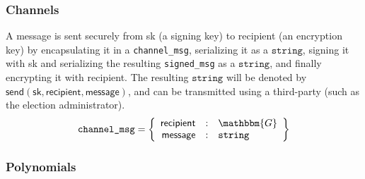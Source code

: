 \documentclass[a4paper]{article}
\newcommand{\G}{\mathbbm{G}}
\newcommand{\jstring}{\texttt{string}}
\begin{document}
\subsubsection{Channels}
\label{channels}

A \textsf{message} is sent securely from \textsf{sk} (a signing key)
to \textsf{recipient} (an encryption key) by encapsulating it in a
\texttt{channel\_msg}, serializing it as a $\jstring$, signing it with
\textsf{sk} and serializing the resulting \texttt{signed\_msg} as a
$\jstring$, and finally encrypting it with \textsf{recipient}. The
resulting $\jstring$ will be denoted by
$\textsf{send}(\textsf{sk},\textsf{recipient},\textsf{message})$, and
can be transmitted using a third-party (such as the election
administrator).
\begin{gather*}
  \texttt{channel\_msg}=\left\{
    \begin{array}{rcl}
      \textsf{recipient}&:&\G\\
      \textsf{message}&:&\jstring
    \end{array}
  \right\}
\end{gather*}

\subsubsection{Polynomials}
\label{polynomials}
\end{document}
